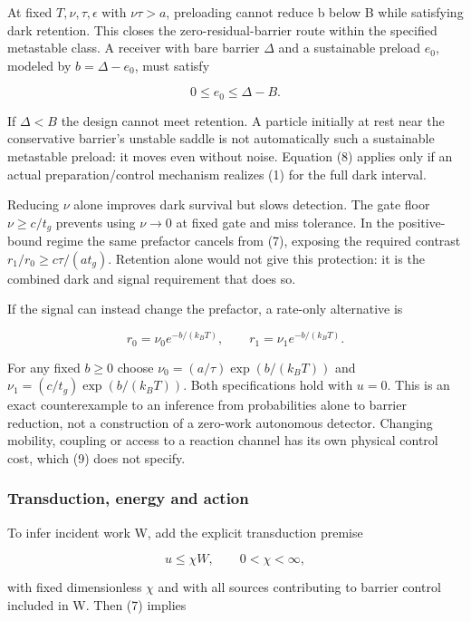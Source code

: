\documentclass[11pt,a4paper]{article}
\begin{document}
At fixed \(T,\nu,\tau,\epsilon\) with \(\nu\tau>a\), preloading cannot
reduce b below B while satisfying dark retention. This closes the
zero-residual-barrier route within the specified metastable class. A
receiver with bare barrier \(\Delta\) and a sustainable preload \(e_0\),
modeled by \(b=\Delta-e_0\), must satisfy

\[0\le e_0\le\Delta-B. \tag{8}\]

If \(\Delta<B\) the design cannot meet retention. A particle initially
at rest near the conservative barrier's unstable saddle is not
automatically such a sustainable metastable preload: it moves even
without noise. Equation (8) applies only if an actual
preparation/control mechanism realizes (1) for the full dark interval.

Reducing \(\nu\) alone improves dark survival but slows detection. The
gate floor \(\nu\ge c/t_g\) prevents using \(\nu\to0\) at fixed gate and
miss tolerance. In the positive-bound regime the same prefactor cancels
from (7), exposing the required contrast \(r_1/r_0\ge c\tau/(at_g)\).
Retention alone would not give this protection: it is the combined dark
and signal requirement that does so.

If the signal can instead change the prefactor, a rate-only alternative
is

\[r_0=\nu_0 e^{-b/(k_BT)},\qquad
r_1=\nu_1 e^{-b/(k_BT)}. \tag{9}\]

For any fixed \(b\ge0\) choose \(\nu_0=(a/\tau)\exp(b/(k_BT))\) and
\(\nu_1=(c/t_g)\exp(b/(k_BT))\). Both specifications hold with \(u=0\).
This is an exact counterexample to an inference from probabilities alone
to barrier reduction, not a construction of a zero-work autonomous
detector. Changing mobility, coupling or access to a reaction channel
has its own physical control cost, which (9) does not specify.

\hypertarget{transduction-energy-and-action}{%
\subsubsection{Transduction, energy and
action}\label{transduction-energy-and-action}}

To infer incident work W, add the explicit transduction premise

\[u\le\chi W,\qquad 0<\chi<\infty, \tag{10}\]

with fixed dimensionless \(\chi\) and with all sources contributing to
barrier control included in W. Then (7) implies
\end{document}
